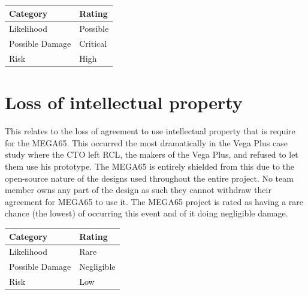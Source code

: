 \begin{tabular}{l|l} %
    	\textbf{Category} 	&	\textbf{Rating} \\
      \hline
     Likelihood			&	Possible \\
     Possible Damage 	& 	Critical \\
     Risk 				&	High		\\	
    \end{tabular}


\section{Loss of intellectual property}
This relates to the loss of agreement to use intellectual property that is require for the MEGA65. This occurred the most dramatically in the Vega Plus case study where the CTO left RCL, the makers of the Vega Plus, and refused to let them use his prototype. The MEGA65 is entirely shielded from this due to the open-source nature of the designs used throughout the entire project. No team member owns any part of the design as such they cannot withdraw their agreement for MEGA65 to use it. The MEGA65 project is rated as having a rare chance (the lowest) of occurring this event and of it doing negligible damage.  \\

\begin{tabular}{l|l} %
    	\textbf{Category} 	&	\textbf{Rating} \\
      \hline
     Likelihood			&	Rare \\
     Possible Damage 	& 	Negligible \\
     Risk 				&	Low		\\	
    \end{tabular}


